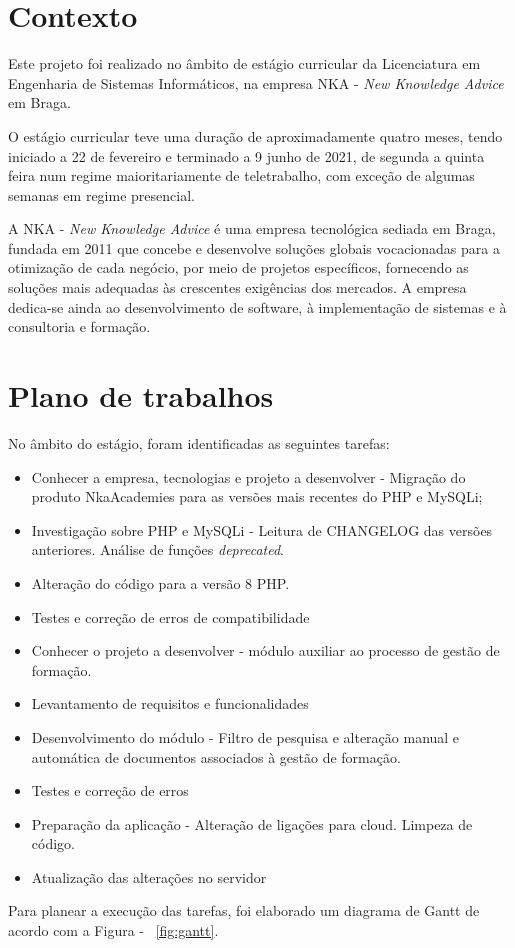 \section{Contexto}
\par Este projeto foi realizado no âmbito de estágio curricular da Licenciatura em Engenharia de Sistemas Informáticos, na empresa NKA - \textit{New Knowledge Advice} em Braga.
\par O estágio curricular teve uma duração de aproximadamente quatro meses, tendo iniciado a 22 de fevereiro e terminado a 9 junho de 2021, de segunda a quinta feira num regime maioritariamente de teletrabalho, com exceção de algumas semanas em regime presencial.
\par A NKA - \textit{New Knowledge Advice} é uma empresa tecnológica sediada em Braga, fundada em 2011 que concebe e desenvolve soluções globais vocacionadas para a otimização de cada negócio, por meio de projetos específicos, fornecendo as soluções mais adequadas às crescentes exigências dos mercados. A empresa dedica-se ainda ao desenvolvimento de software, à implementação de sistemas e à consultoria e formação\citep{nka}. 

\section{Plano de trabalhos}

No âmbito do estágio, foram identificadas as seguintes tarefas:

\begin{itemize}
    \item  Conhecer a empresa, tecnologias e projeto a desenvolver - Migração do produto NkaAcademies para as versões mais recentes do PHP e MySQLi;
    \item  Investigação sobre PHP e MySQLi - Leitura de CHANGELOG das versões anteriores. Análise de funções \textit{deprecated}.
    \item  Alteração do código para a versão 8 PHP.
    \item  Testes e correção de erros de compatibilidade
    \item  Conhecer o projeto a desenvolver - módulo auxiliar ao processo de gestão de formação.
    \item Levantamento de requisitos e funcionalidades
    \item  Desenvolvimento do módulo - Filtro de pesquisa e alteração manual e automática de documentos associados à gestão de formação.
    \item Testes e correção de erros
    \item  Preparação da aplicação - Alteração de ligações para cloud. Limpeza de código.
    \item Atualização das alterações no servidor
\end{itemize}
Para planear a execução das tarefas, foi elaborado um diagrama de Gantt de acordo com a Figura - ~\ref{fig:gantt}.


